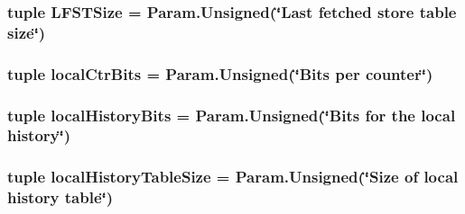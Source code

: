 \hypertarget{classOzoneCPU_1_1DerivOzoneCPU_ae8cdf1f1e20a08d0b3200297a9da7d60}{
\subsubsection[{LFSTSize}]{\setlength{\rightskip}{0pt plus 5cm}tuple {\bf LFSTSize} = Param.Unsigned(\char`\"{}Last fetched store table size\char`\"{})}}
\label{classOzoneCPU_1_1DerivOzoneCPU_ae8cdf1f1e20a08d0b3200297a9da7d60}
\hypertarget{classOzoneCPU_1_1DerivOzoneCPU_a2da1de2b433849a9666f13cf821c1539}{
\subsubsection[{localCtrBits}]{\setlength{\rightskip}{0pt plus 5cm}tuple {\bf localCtrBits} = Param.Unsigned(\char`\"{}Bits per counter\char`\"{})}}
\label{classOzoneCPU_1_1DerivOzoneCPU_a2da1de2b433849a9666f13cf821c1539}
\hypertarget{classOzoneCPU_1_1DerivOzoneCPU_abc8222dc26502ccba1f3eadbb2663bc0}{
\subsubsection[{localHistoryBits}]{\setlength{\rightskip}{0pt plus 5cm}tuple {\bf localHistoryBits} = Param.Unsigned(\char`\"{}Bits for the local history\char`\"{})}}
\label{classOzoneCPU_1_1DerivOzoneCPU_abc8222dc26502ccba1f3eadbb2663bc0}
\hypertarget{classOzoneCPU_1_1DerivOzoneCPU_a711db16eca8627517aca59fb2aa5565b}{
\subsubsection[{localHistoryTableSize}]{\setlength{\rightskip}{0pt plus 5cm}tuple {\bf localHistoryTableSize} = Param.Unsigned(\char`\"{}Size of local history table\char`\"{})}}
